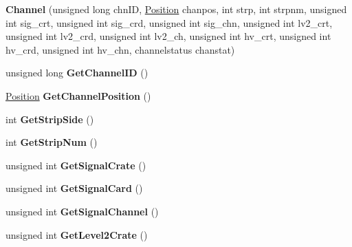 \begin{DoxyCompactItemize}
\item 
\hypertarget{classChannel_ae1078b5c2230dd8fcba2bbd4e8100c57}{{\bfseries Channel} (unsigned long chn\-I\-D, \hyperlink{classPosition}{Position} chanpos, int strp, int strpnm, unsigned int sig\-\_\-crt, unsigned int sig\-\_\-crd, unsigned int sig\-\_\-chn, unsigned int lv2\-\_\-crt, unsigned int lv2\-\_\-crd, unsigned int lv2\-\_\-ch, unsigned int hv\-\_\-crt, unsigned int hv\-\_\-crd, unsigned int hv\-\_\-chn, channelstatus chanstat)}\label{classChannel_ae1078b5c2230dd8fcba2bbd4e8100c57}

\item 
\hypertarget{classChannel_a135981325d6cd967c06b27eef9f0abb0}{unsigned long {\bfseries Get\-Channel\-I\-D} ()}\label{classChannel_a135981325d6cd967c06b27eef9f0abb0}

\item 
\hypertarget{classChannel_a20f0f3be320a2bb029169a4dbe93cf90}{\hyperlink{classPosition}{Position} {\bfseries Get\-Channel\-Position} ()}\label{classChannel_a20f0f3be320a2bb029169a4dbe93cf90}

\item 
\hypertarget{classChannel_aaf73be7554bca0d37886ead17e7dd378}{int {\bfseries Get\-Strip\-Side} ()}\label{classChannel_aaf73be7554bca0d37886ead17e7dd378}

\item 
\hypertarget{classChannel_a8e11f287e50dd85bc16ec31cab5b19f5}{int {\bfseries Get\-Strip\-Num} ()}\label{classChannel_a8e11f287e50dd85bc16ec31cab5b19f5}

\item 
\hypertarget{classChannel_a75f4e595dfd853b4705aaab4b4dd7e5d}{unsigned int {\bfseries Get\-Signal\-Crate} ()}\label{classChannel_a75f4e595dfd853b4705aaab4b4dd7e5d}

\item 
\hypertarget{classChannel_a3fe69d8eb34bbb71101faa490eff401c}{unsigned int {\bfseries Get\-Signal\-Card} ()}\label{classChannel_a3fe69d8eb34bbb71101faa490eff401c}

\item 
\hypertarget{classChannel_a0adb3da425cdc8571e3f2070339d1b45}{unsigned int {\bfseries Get\-Signal\-Channel} ()}\label{classChannel_a0adb3da425cdc8571e3f2070339d1b45}

\item 
\hypertarget{classChannel_aed336de8cbfe7b004a966b08998f10a1}{unsigned int {\bfseries Get\-Level2\-Crate} ()}\label{classChannel_aed336de8cbfe7b004a966b08998f10a1}


\end{DoxyCompactItemize}
